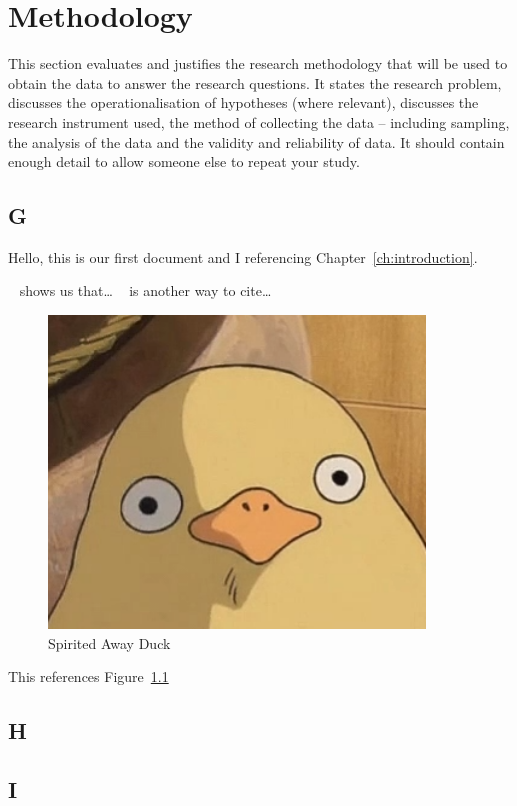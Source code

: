 \chapter{Methodology}\label{ch:methodology}

This section evaluates and justifies the research methodology that will be used to obtain the data to answer the research questions. It states the research problem, discusses the operationalisation of hypotheses (where relevant), discusses the research instrument used, the method of collecting the data – including sampling, the analysis of the data and the validity and reliability of data. It should contain enough detail to allow someone else to repeat your study.

\section{G}\label{sec:G}
Hello, this is our first document and I referencing Chapter~\ref{ch:introduction}.

~\cite{ani2019victory} shows us that\ldots
~\cite*{ani2019victory} is another way to cite\ldots


\begin{figure}[h]
    \centering
    \includegraphics[width=10cm]{figures/SpiritedAwayDuck3}
    \caption{Spirited Away Duck}
    \label{fig:SpiritedAwayDuck}
\end{figure}


This references Figure~\ref{fig:SpiritedAwayDuck}

\lipsum[1-5]

\section{H}\label{sec:H}
\lipsum[1-5]

\section{I}\label{sec:I}
\lipsum[1-5]